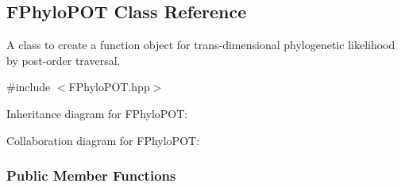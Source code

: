 \hypertarget{classFPhyloPOT}{\subsection{\-F\-Phylo\-P\-O\-T \-Class \-Reference}
\label{classFPhyloPOT}
}


\-A class to create a function object for trans-\/dimensional phylogenetic likelihood by post-\/order traversal.  




{\ttfamily \#include $<$\-F\-Phylo\-P\-O\-T.\-hpp$>$}



\-Inheritance diagram for \-F\-Phylo\-P\-O\-T\-:


\-Collaboration diagram for \-F\-Phylo\-P\-O\-T\-:
\subsubsection*{\-Public \-Member \-Functions}
